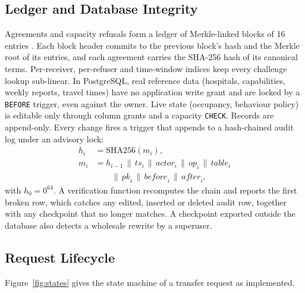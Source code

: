 \subsection{Ledger and Database Integrity}
\label{sec:db}
Agreements and capacity refusals form a ledger of Merkle-linked blocks of 16 entries \cite{merkle1988signature,haber1991timestamp}. Each block header commits to the previous block's hash and the Merkle root of its entries, and each agreement carries the SHA-256 hash of its canonical terms. Per-receiver, per-refuser and time-window indices keep every challenge lookup sub-linear. In PostgreSQL, real reference data (hospitals, capabilities, weekly reports, travel times) have no application write grant and are locked by a \texttt{BEFORE} trigger, even against the owner. Live state (occupancy, behaviour policy) is editable only through column grants and a capacity \texttt{CHECK}. Records are append-only. Every change fires a trigger that appends to a hash-chained audit log under an advisory lock:
\begin{equation}
\begin{aligned}
  h_i &= \mathrm{SHA256}(m_i),\\
  m_i &= h_{i-1}\,\|\,\mathit{ts}_i\,\|\,\mathit{actor}_i\,\|\,\mathit{op}_i\,\|\,\mathit{table}_i\\
      &\qquad \|\,\mathit{pk}_i\,\|\,\mathit{before}_i\,\|\,\mathit{after}_i,
\end{aligned}
  \label{eq:audit}
\end{equation}
with $h_0=0^{64}$. A verification function recomputes the chain and reports the first broken row, which catches any edited, inserted or deleted audit row, together with any checkpoint that no longer matches. A checkpoint exported outside the database also detects a wholesale rewrite by a superuser.

\subsection{Request Lifecycle}
Figure~\ref{fig:states} gives the state machine of a transfer request as implemented.

